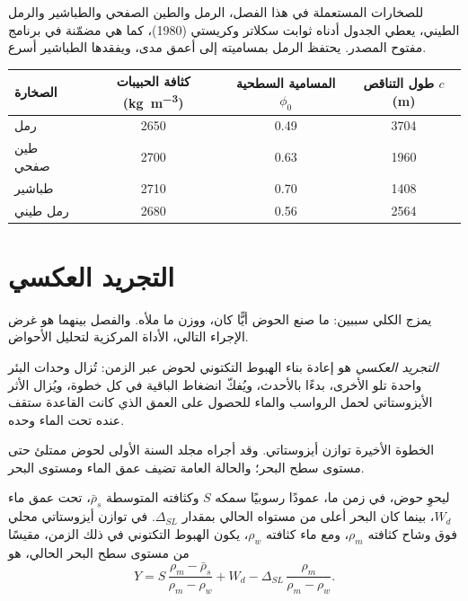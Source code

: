 للصخارات المستعملة في هذا الفصل، الرمل والطين الصفحي والطباشير والرمل الطيني، يعطي الجدول أدناه
ثوابت سكلاتر وكريستي (1980)، كما هي مضمّنة في برنامج مفتوح المصدر.
يحتفظ الرمل بمساميته إلى أعمق مدى، ويفقدها الطباشير أسرع.

\begin{center}
\small
\begin{tabular}{lccc}
\hline
الصخارة & كثافة الحبيبات (\unit{kg.m^{-3}}) & المسامية السطحية $\phi_0$ & طول التناقص $c$ (\unit{m}) \\
\hline
رمل & 2650 & 0.49 & 3704 \\
طين صفحي & 2700 & 0.63 & 1960 \\
طباشير & 2710 & 0.70 & 1408 \\
رمل طيني & 2680 & 0.56 & 2564 \\
\hline
\end{tabular}
\end{center}

\section{التجريد العكسي}\label{sec:b2:basins-compared:backstripping}

يمزج  الكلي سببين: ما صنع الحوض أيًّا كان، ووزن ما
ملأه. والفصل بينهما هو غرض الإجراء التالي، الأداة المركزية لتحليل
الأحواض.

\begin{definition}\label{def:b2:basins-compared:backstripping}
\emph{التجريد العكسي} هو إعادة بناء الهبوط التكتوني لحوض
عبر الزمن: تُزال وحدات البئر واحدة تلو الأخرى، بدءًا بالأحدث،
ويُفكّ انضغاط الباقية في كل خطوة، ويُزال الأثر الأيزوستاتي لحمل الرواسب والماء
للحصول على العمق الذي كانت القاعدة ستقف عنده تحت الماء وحده.
\end{definition}

الخطوة الأخيرة توازن أيزوستاتي. وقد أجراه مجلد السنة الأولى لحوض ممتلئ حتى مستوى سطح البحر؛
والحالة العامة تضيف عمق الماء ومستوى البحر.

\begin{proposition}\label{prop:b2:basins-compared:backstrip}
ليحوِ حوض، في زمن ما، عمودًا رسوبيًا سمكه $S$ وكثافته المتوسطة
$\bar\rho_s$، تحت عمق ماء $W_d$، بينما كان البحر أعلى من مستواه الحالي بمقدار $\Delta_{SL}$.
في توازن أيزوستاتي محلي فوق وشاح كثافته $\rho_m$، ومع ماء كثافته $\rho_w$، يكون
الهبوط التكتوني في ذلك الزمن، مقيسًا من مستوى سطح البحر الحالي، هو
\[
  Y = S\,\frac{\rho_m - \bar\rho_s}{\rho_m - \rho_w} + W_d
      - \Delta_{SL}\,\frac{\rho_m}{\rho_m - \rho_w}.
\]
\end{proposition}

